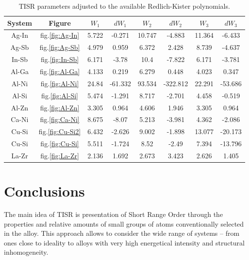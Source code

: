 \documentclass[12pt,abstract]{scrartcl}
\begin{document}
\begin{table}[ht]
  \begin{center}
    \caption{TISR parameters adjusted to the available Redlich-Kister polynomials.}
    \label{tab:table1}
    \begin{tabular}{|c|c|SS|SS|SS|} %
	 \hline
      System &{Figure} & ${W_1}$ & ${dW_1}$ & ${W_2}$ & ${dW_2}$ & ${W_3}$ & ${dW_3}$\\
      \hline
Ag-In & fig.\ref{fig:Ag-In} & 5.722 & -0.271 & 10.747 & -4.883 & 11.364 & -6.433\\ \hline
Ag-Sb & fig.\ref{fig:Ag-Sb} & 4.979 & 0.959 & 6.372 & 2.428 & 8.739 & -4.637\\ \hline
In-Sb & fig.\ref{fig:In-Sb} & 6.171 & -3.78 & 10.4 & -7.822 & 6.171 & -3.781\\ \hline
Al-Ga & fig.\ref{fig:Al-Ga} & 4.133 & 0.219 & 6.279 & 0.448 & 4.023 & 0.347\\ \hline 
Al-Ni & fig.\ref{fig:Al-Ni} & 24.84 & -61.332 & 93.534 & -322.812 & 22.291 & -53.686\\ \hline
Al-Si & fig.\ref{fig:Al-Si} & 5.474 & -1.291 & 8.717 & -2.701 & 4.458 & -0.519\\ \hline
Al-Zn & fig.\ref{fig:Al-Zn} & 3.305 & 0.964 & 4.606 & 1.946 & 3.305 & 0.964\\ \hline
Ca-Ni & fig.\ref{fig:Ca-Ni} & 8.675 & -8.07 & 5.213 & -3.981 & 4.362 & -2.086\\ \hline
Cu-Si & fig.\ref{fig:Cu-Si2} & 6.432 & -2.626 & 9.002 & -1.898 & 13.077 & -20.173\\ \hline
Cu-Si & fig.\ref{fig:Cu-Si} & 5.511 & -1.724 & 8.52 & -2.49 & 7.394 & -13.796\\ \hline
La-Zr & fig.\ref{fig:La-Zr} & 2.136 & 1.692 & 2.673 & 3.423 & 2.626 & 1.405\\ \hline
    \end{tabular}
  \end{center}
\end{table}


\section{Conclusions}
The main idea of TISR is presentation of Short Range Order through the properties and relative amounts of small groups of atoms conventionally selected in the alloy. This approach allows to consider the wide range of systems -- from ones close to ideality to alloys with very high energetical intensity and structural inhomogeneity.
\end{document}
